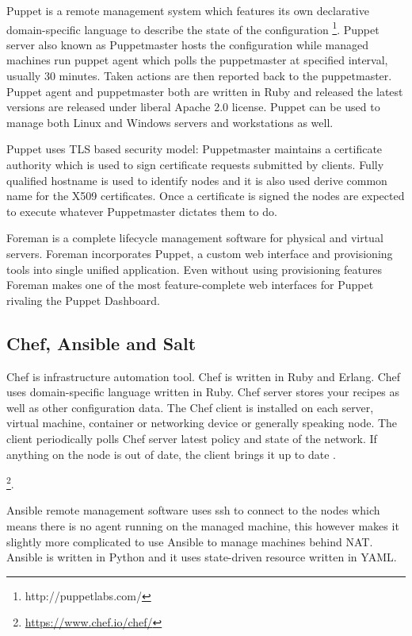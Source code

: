 \documentclass[a4paper,11pt]{kth-mag}
\begin{document}
Puppet is a remote management system which features its own declarative
domain-specific language to describe the state of the configuration
\footnote{http://puppetlabs.com/}. Puppet server also known as Puppetmaster
hosts the configuration while managed machines run puppet agent which polls
the puppetmaster at specified interval, usually 30 minutes. Taken actions
are then reported back to the puppetmaster. Puppet agent and puppetmaster
both are written in Ruby and released the latest versions are released under
liberal Apache 2.0 license. Puppet can be used to manage both Linux and
Windows servers and workstations as well.

Puppet uses TLS based security model:
Puppetmaster maintains a certificate authority which is used
to sign certificate requests submitted by clients.
Fully qualified hostname is used to identify nodes and
it is also used derive common name for the X509 certificates.
Once a certificate is signed the nodes are expected to
execute whatever Puppetmaster dictates them to do.

Foreman is a complete lifecycle management software for physical and virtual
servers. Foreman incorporates Puppet, a custom web interface and provisioning
tools into single unified application. Even without using provisioning features
Foreman makes one of the most feature-complete web interfaces for Puppet
rivaling the Puppet Dashboard.

\subsection{Chef, Ansible and Salt}

Chef is infrastructure automation tool. Chef is written in Ruby and Erlang.
Chef uses domain-specific language written in Ruby.
Chef server stores your recipes as well as other configuration data.
The Chef client is installed on each server, virtual machine, container
or networking device or generally speaking node.
The client periodically polls Chef server latest policy and
state of the network. If anything on the node is out of date,
the client brings it up to date \cite{linuxmag-7841}.

\footnote{\url{https://www.chef.io/chef/}}.

Ansible remote management software uses \acrfull{ssh} to connect to the nodes which
means there is no agent running on the managed machine, this however makes
it slightly more complicated to use Ansible to manage machines behind NAT.
Ansible is written in Python and it uses state-driven resource
written in YAML.
\end{document}
